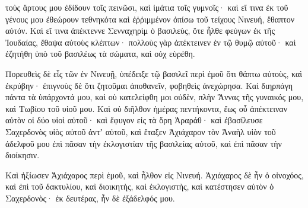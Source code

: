 {τοὺς ἄρτους μου ἐδίδουν τοῖς πεινῶσι, καὶ ἱμάτια τοῖς γυμνοῖς· καὶ εἴ τινα ἐκ τοῦ γένους μου ἐθεώρουν τεθνηκότα καὶ ἐῤῥιμμένον ὀπίσω τοῦ τείχους Νινευή, ἔθαπτον αὐτόν.
Καὶ εἴ τινα ἀπέκτεννε Σενναχηρὶμ ὁ βασιλεὺς, ὅτε ἦλθε φεύγων ἐκ τῆς Ἰουδαίας, ἔθαψα αὐτοὺς κλέπτων· πολλοὺς γὰρ ἀπέκτεινεν ἐν τῷ θυμῷ αὐτοῦ· καὶ ἐζητήθη ὑπὸ τοῦ βασιλέως τὰ σώματα, καὶ οὐχ εὑρέθη.
\par }{\PP {}Πορευθεὶς δὲ εἷς τῶν ἐν Νινευῇ, ὑπέδειξε τῷ βασιλεῖ περὶ ἐμοῦ ὅτι θάπτω αὐτοὺς, καὶ ἐκρύβην· ἐπιγνοὺς δὲ ὅτι ζητοῦμαι ἀποθανεῖν, φοβηθεὶς ἀνεχώρησα.
Καὶ διηρπάγη πάντα τὰ ὑπάρχοντά μου, καὶ οὐ κατελείφθη μοι οὐδὲν, πλὴν Ἄννας τῆς γυναικός μου, καὶ Τωβίου τοῦ υἱοῦ μου.
Καὶ οὐ διῆλθον ἡμέρας πεντήκοντα, ἕως οὗ ἀπέκτειναν αὐτὸν οἱ δύο υἱοὶ αὐτοῦ· καὶ ἔφυγον εἰς τὰ ὄρη Ἀραράθ· καὶ ἐβασίλευσε Σαχερδονὸς υἱὸς αὐτοῦ ἀντʼ αὐτοῦ, καὶ ἔταξεν Ἀχιάχαρον τὸν Ἀναὴλ υἱὸν τοῦ ἀδελφοῦ μου ἐπὶ πᾶσαν τὴν ἐκλογιστίαν τῆς βασιλείας αὐτοῦ, καὶ ἐπὶ πᾶσαν τὴν διοίκησιν.
\par }{\PP {}Καὶ ἠξίωσεν Ἀχιάχαρος περὶ ἐμοῦ, καὶ ἦλθον εἰς Νινευή. Ἀχιάχαρος δὲ ἦν ὁ οἰνοχόος, καὶ ἐπὶ τοῦ δακτυλίου, καὶ διοικητὴς, καὶ ἐκλογιστὴς, καὶ κατέστησεν αὐτὸν ὁ Σαχερδονὸς· ἐκ δευτέρας, ἦν δὲ ἐξάδελφός μου.

}
